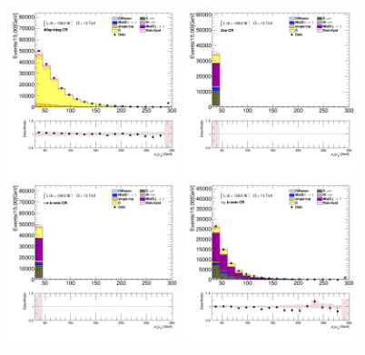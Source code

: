 		\begin{figure}[!htp]
			\begin{center}    
			\includegraphics[width=0.45\textwidth]{chapters/chapter6_HPlus/images/taulep/mu_0_pt_DILEP_BTAG.png}
			\includegraphics[width=0.45\textwidth]{chapters/chapter6_HPlus/images/taulep/mu_0_pt_ZEE.png} \\
			\includegraphics[width=0.45\textwidth]{chapters/chapter6_HPlus/images/taulep/mu_0_pt_TAUEL_BVETO.png} 
			\includegraphics[width=0.45\textwidth]{chapters/chapter6_HPlus/images/taulep/mu_0_pt_TAUMU_BVETO.png} \\

\end{center}
\end{figure}
